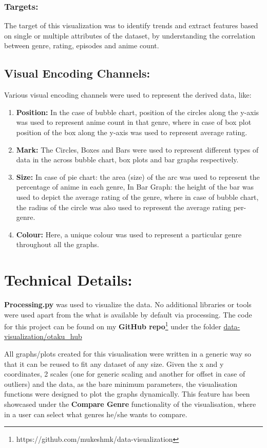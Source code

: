 \documentclass[a4paper, 10pt]{article}
\begin{document}
    \subsubsection{Targets:}
    \qquad The target of this visualization was to identify trends and extract features based on single or multiple attributes of the dataset, by understanding the correlation between genre, rating, episodes and anime count.
    \subsection{Visual Encoding Channels:}
    \qquad Various visual encoding channels were used to represent the derived data, like:
    \begin{enumerate}
        \item \textbf{Position:} In the case of bubble chart, position of the circles along the y-axis was used to represent anime count in that genre, where in case of box plot position of the box along the y-axis was used to represent average rating.
        \item \textbf{Mark:} The Circles, Boxes and Bars were used to represent different types of data in the across bubble chart, box plots and bar graphs respectively.
        \item \textbf{Size:} In case of pie chart: the area (size) of the arc was used to represent the percentage of anime in each genre, In Bar Graph: the height of the bar was used to depict the average rating of the genre, where in case of bubble chart, the radius of the circle was also used to represent the average rating per-genre.
        \item \textbf{Colour:} Here, a unique colour was used to represent a particular genre throughout all the graphs.
    \end{enumerate}
\section{Technical Details:}
    \qquad \textbf{Processing.py} was used to visualize the data. No additional libraries or tools were used apart from the what is available by default via processing. The code for this project can be found on my \textbf{GitHub repo}\footnote{https://github.com/mukeshmk/data-visualization} under the folder \href{https://github.com/mukeshmk/data-visualization/tree/master/otaku_hub}{data-visualization/otaku\_hub}

    \qquad All graphs/plots created for this visualisation were written in a generic way so that it can be reused to fit any dataset of any size. Given the x and y coordinates, 2 scales (one for generic scaling and another for offset in case of outliers) and the data, as the bare minimum parameters, the visualisation functions were designed to plot the graphs dynamically. This feature has been showcased under the \textbf{Compare Genre} functionality of the visualisation, where in a user can select what genres he/she wants to compare.
\end{document}
